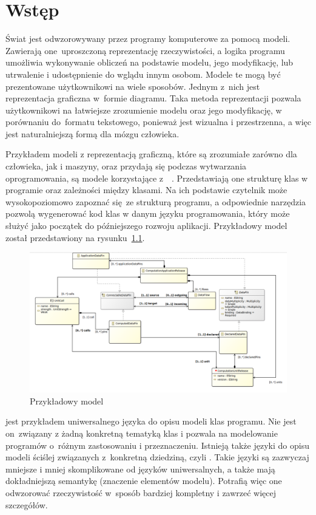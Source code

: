 \chapter{Wstęp}

Świat jest odwzorowywany przez programy komputerowe za pomocą modeli.
Zawierają one~uproszczoną reprezentację rzeczywistości, a logika programu
umożliwia wykonywanie obliczeń na podstawie modelu, jego modyfikację, lub
utrwalenie i udostępnienie do wglądu innym osobom.
Modele te mogą być prezentowane użytkownikowi na wiele sposobów. Jednym z~nich
jest reprezentacja graficzna w~formie diagramu. Taka metoda reprezentacji
pozwala użytkownikowi na łatwiejsze zrozumienie modelu
oraz jego modyfikację, w porównaniu do~formatu tekstowego, ponieważ jest
wizualna i przestrzenna, a więc jest naturalniejszą formą dla mózgu człowieka.

Przykładem modeli z reprezentacją graficzną, które są zrozumiałe zarówno dla
człowieka, jak i maszyny, oraz
przydają się podczas wytwarzania oprogramowania, są modele korzystające
z~~\cite{wikipedia-uml}. Przedstawiają
one strukturę klas w programie oraz zależności między klasami. Na ich podstawie
czytelnik może wysokopoziomowo zapoznać się~ze strukturą programu, a
odpowiednie narzędzia pozwolą wygenerować kod klas w danym języku
programowania, który może służyć jako początek do późniejszego rozwoju
aplikacji. Przykładowy model  został przedstawiony na
rysunku~\ref{rys:przykladowy-model-uml}.

\begin{figure}[!ht]
	\centering
	\includegraphics[width=0.95\linewidth]{./images/example-uml-model.png}
	\caption{Przykładowy model
		}\label{rys:przykladowy-model-uml}
\end{figure}

 jest przykładem uniwersalnego języka do opisu modeli klas
programu.
Nie jest on~związany z żadną konkretną tematyką klas i pozwala na modelowanie
programów o~różnym zastosowaniu i przeznaczeniu. Istnieją także języki do opisu
modeli ściślej związanych z~konkretną dziedziną, czyli . Takie
języki
są zazwyczaj mniejsze i mniej skomplikowane od języków uniwersalnych, a także
mają dokładniejszą semantykę (znaczenie elementów modelu). Potrafią więc one
odwzorować rzeczywistość w~sposób bardziej kompletny i zawrzeć więcej
szczegółów.

